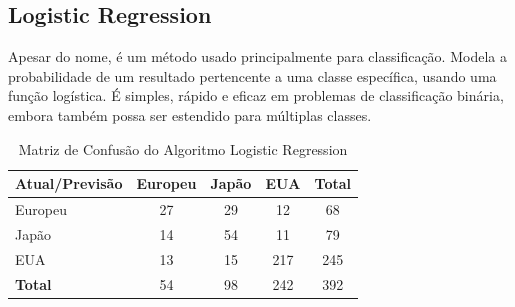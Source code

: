 \documentclass[conference]{IEEEtran}
\begin{document}
\subsection{Logistic Regression}
Apesar do nome, é um método usado principalmente para classificação. Modela a probabilidade de um resultado pertencente a
uma classe específica, usando uma função logística. É simples, rápido e eficaz em problemas de classificação binária,
embora também possa ser estendido para múltiplas classes.
\begin{table}[!ht]
	\centering
	\begin{tabular}{lcccc}
		\toprule
		\textbf{Atual/Previsão} & \textbf{Europeu} & \textbf{Japão} & \textbf{EUA} & \textbf{Total} \\
		\midrule
		Europeu                 & 27               & 29             & 12           & 68             \\
		Japão                   & 14               & 54             & 11           & 79             \\
		EUA                     & 13               & 15             & 217          & 245            \\
		\midrule
		\textbf{Total}          & 54               & 98             & 242          & 392            \\
		\bottomrule
	\end{tabular}
	\label{tab:conf_matrix_logistic}
	\caption{Matriz de Confusão do Algoritmo Logistic Regression}
\end{table}

\end{document}

